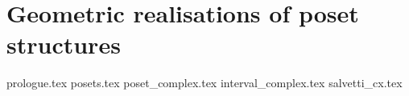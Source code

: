 \documentclass[class=article, crop=false]{standalone}
\begin{document}
\chapter{Geometric realisations of poset structures}
\label{chap:geom_poset}
{prologue.tex}
{posets.tex}
{poset_complex.tex}
{interval_complex.tex}
{salvetti_cx.tex}
\end{document}
